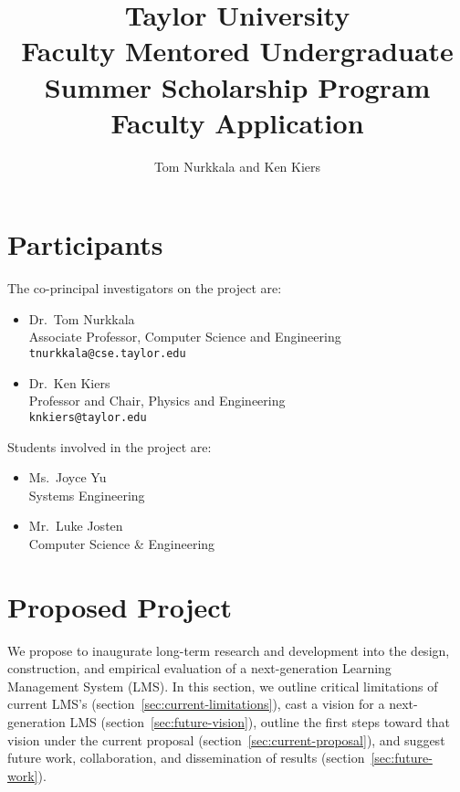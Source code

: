 \documentclass{article}
\title{Taylor University\\
  Faculty Mentored Undergraduate\\
  Summer Scholarship Program\\
  Faculty Application}
\author{Tom Nurkkala and Ken Kiers}
\begin{document}
\maketitle
\tableofcontents

\section{Participants}
\label{sec:participants}

The co-principal investigators on the project are:
\begin{itemize}
\item Dr.\ Tom Nurkkala\\
  Associate Professor, Computer Science and Engineering\\
  \texttt{tnurkkala@cse.taylor.edu}
\item Dr.\ Ken Kiers\\
  Professor and Chair, Physics and Engineering\\
  \texttt{knkiers@taylor.edu}
\end{itemize}
Students involved in the project are:
\begin{itemize}
\item Ms.\ Joyce Yu\\
  Systems Engineering
\item Mr.\ Luke Josten\\
  Computer Science \& Engineering
\end{itemize}


\section{Proposed Project}
\label{sec:proposed-project}


We propose to inaugurate long-term research and development
into the design, construction, and empirical evaluation
of a next-generation Learning Management System (LMS).
In this section, we
outline critical limitations of current LMS's (section~\ref{sec:current-limitations}),
cast a vision for a next-generation LMS (section~\ref{sec:future-vision}),
outline the first steps toward that vision under the current proposal (section~\ref{sec:current-proposal}),
and suggest future work, collaboration, and dissemination of results (section~\ref{sec:future-work}).
\end{document}
